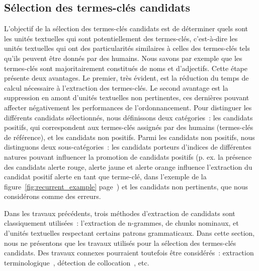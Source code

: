   \subsection{Sélection des termes-clés candidats}
  \label{subsec:extraction_de_termes_cles_candidats}
    L'objectif de la sélection des termes-clés candidats est de déterminer quels
    sont les unités textuelles qui sont potentiellement des termes-clés,
    c'est-à-dire les unités textuelles qui ont des particularités similaires à
    celles des termes-clés tels qu'ils peuvent être donnés par des humains. Nous
    savons par exemple que les termes-clés sont majoritairement constitués de
    noms et d'adjectifs. Cette étape présente deux avantages. Le premier, très
    évident, est la réduction du temps de calcul nécessaire à l'extraction des
    termes-clés. Le second avantage est la suppression en amont d'unités
    textuelles non pertinentes, ces dernières pouvant affecter négativement les
    performances de l'ordonnancement. Pour distinguer les différents candidats
    sélectionnés, nous définissons deux catégories~: les candidats positifs, qui
    correspondent aux termes-clés assignés par des humains (termes-clés de
    référence), et les candidats non positifs. Parmi les candidats non positifs,
    nous distinguons deux sous-catégories~: les candidats porteurs d'indices de
    différentes natures pouvant influencer la promotion de candidats positifs
    (p. ex. la présence des candidats \og{}alerte rouge\fg{}, \og{}alerte
    jaune\fg{} et \og{}alerte orange\fg{} influence l'extraction du candidat
    positif \og{}alerte\fg{} en tant que terme-clé, dans l'exemple de la
    figure~\ref{fig:recurrent_example} page~\pageref{fig:recurrent_example}) et
    les candidats non pertinents, que nous considérons comme des erreurs.

    Dans les travaux précédents, trois méthodes d'extraction de candidats sont
    classiquement utilisées~: l'extraction de n-grammes, de chunks nominaux, et
    d'unités textuelles respectant certains patrons grammaticaux. Dans cette
    section, nous ne présentons que les travaux utilisés pour la sélection des
    termes-clés candidats. Des travaux connexes pourraient toutefois être
    considérés~: extraction
    terminologique~\cite{castellvi2001automatictermdetection}, détection de
    collocation~\cite{pearce2002collocationdetection}, etc.

